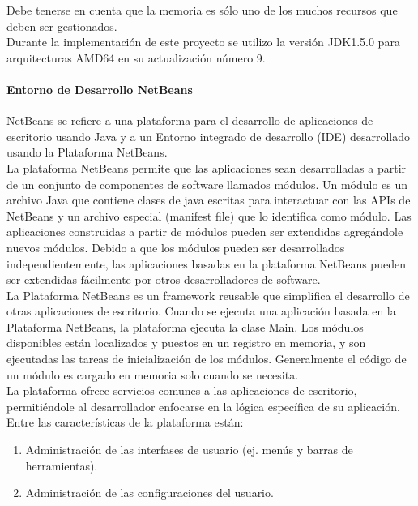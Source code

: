 \begin{description}
Debe tenerse en cuenta que la memoria es s\'olo uno de los muchos recursos que deben ser gestionados.\\

Durante la implementaci\'on de este proyecto se utilizo la versi\'on JDK1.5.0 para arquitecturas AMD64 en su actualizaci\'on n\'umero 9.

\paragraph{Entorno de Desarrollo NetBeans}
NetBeans se refiere a una plataforma para el desarrollo de aplicaciones de escritorio usando Java y a un Entorno integrado de desarrollo (IDE) desarrollado usando la Plataforma NetBeans.\\

La plataforma NetBeans permite que las aplicaciones sean desarrolladas a partir de un conjunto de componentes de software llamados m\'odulos. Un m\'odulo es un archivo Java que contiene clases de java escritas para interactuar con las APIs de NetBeans y un archivo especial (manifest file) que lo identifica como m\'odulo. Las aplicaciones construidas a partir de m\'odulos pueden ser extendidas agreg\'andole nuevos m\'odulos. Debido a que los m\'odulos pueden ser desarrollados independientemente, las aplicaciones basadas en la plataforma NetBeans pueden ser extendidas f\'acilmente por otros desarrolladores de software.\\

La Plataforma NetBeans es un framework reusable que simplifica el desarrollo de otras aplicaciones de escritorio. Cuando se ejecuta una aplicaci\'on basada en la Plataforma NetBeans, la plataforma ejecuta la clase Main. Los m\'odulos disponibles est\'an localizados y puestos en un registro en memoria, y son ejecutadas las tareas de inicializaci\'on de los m\'odulos. Generalmente el c\'odigo de un m\'odulo es cargado en memoria solo cuando se necesita.\\

La plataforma ofrece servicios comunes a las aplicaciones de escritorio, permiti\'endole al desarrollador enfocarse en la l\'ogica espec\'ifica de su aplicaci\'on. Entre las caracter\'isticas de la plataforma est\'an:

\begin{enumerate}
 \item Administraci\'on de las interfases de usuario (ej. men\'us y barras de herramientas).

 \item Administraci\'on de las configuraciones del usuario.


\end{enumerate}
\end{description}

